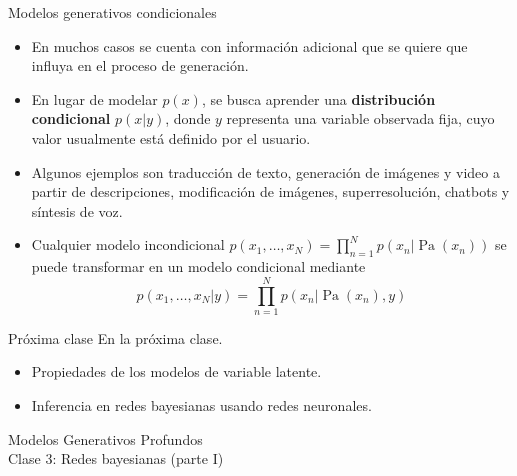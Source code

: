 \documentclass{beamer}
\begin{document}
\begin{frame}{Modelos generativos condicionales}
    \begin{itemize}
        \item En muchos casos se cuenta con información adicional que se quiere que influya en el proceso de generación.
        \item En lugar de modelar $p(x)$, se busca aprender una \textbf{distribución condicional} $p(x|y)$, donde $y$ representa una variable observada fija, cuyo valor usualmente está definido por el usuario.
        \item Algunos ejemplos son traducción de texto, generación de imágenes y video a partir de descripciones, modificación de imágenes, superresolución, chatbots y  síntesis de voz.
        \item Cualquier modelo incondicional $p(x_1,\ldots,x_N)=\prod_{n=1}^N p(x_n|\operatorname{Pa}(x_n))$ se puede transformar en un modelo condicional mediante
              \begin{equation*}
                  p(x_1,\ldots,x_N|y)=\prod_{n=1}^N
                  p(x_n|\operatorname{Pa}(x_n),y)
              \end{equation*}
    \end{itemize}
\end{frame}

\begin{frame}{Próxima clase}
    En la próxima clase.
    \begin{itemize}
        \item Propiedades de los modelos de variable latente.
        \item Inferencia en redes bayesianas usando redes neuronales.
    \end{itemize}
\end{frame}

\begin{frame}
    \centering
    \Large{Modelos Generativos Profundos}\\
    \large{Clase 3: Redes bayesianas (parte I)}
\end{frame}
\end{document}
